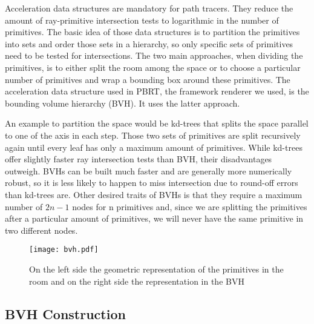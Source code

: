 Acceleration data structures are mandatory for path tracers. They reduce the amount of ray-primitive intersection tests to logarithmic in the number of primitives. The basic idea of those data structures is to partition the primitives into sets and order those sets in a hierarchy, so only specific sets of primitives need to be tested for intersections. The two main approaches, when dividing the primitives, is to either split the room among the space or to choose a particular number of primitives and wrap a bounding box around these primitives. The acceleration data structure used in PBRT, the framework renderer we used, is the bounding volume hierarchy (BVH). It uses the latter approach. \cite{PBRT}

An example to partition the space would be kd-trees that splits the space parallel to one of the axis in each step. Those two sets of primitives are split recursively again until every leaf has only a maximum amount of primitives.  While kd-trees offer slightly faster ray intersection tests than BVH, their disadvantages outweigh. BVHs can be built much faster and are generally more numerically robust, so it is less likely to happen to miss intersection due to round-off errors than kd-trees are. Other desired traits of BVHs is that they require a maximum number of $2n - 1$ nodes for n primitives and, since we are splitting the primitives after a particular amount of primitives, we will never have the same primitive in two different nodes.

\begin{figure}
	\begin{center}
		\texttt{[image: bvh.pdf]}
		\caption{On the left side the geometric representation of the primitives in the room and on the right side the representation in the BVH}
		\label{fig:bvh}
	\end{center}
\end{figure}


\subsection{BVH Construction}
\label{subs:const}


